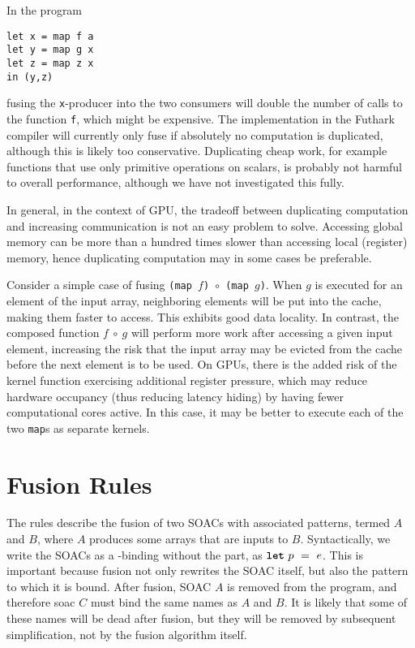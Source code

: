 \begin{description}[style=nextline]
\item[Computation may be duplicated.]

In the program
\begin{lstlisting}
let x = map f a
let y = map g x
let z = map z x
in (y,z)
\end{lstlisting}
fusing the \texttt{x}-producer into the two consumers will double the
number of calls to the function \texttt{f}, which might be expensive.
The implementation in the Futhark compiler will currently only fuse if
absolutely no computation is duplicated, although this is likely too
conservative.  Duplicating cheap work, for example functions that use
only primitive operations on scalars, is probably not harmful to
overall performance, although we have not investigated this fully.

In general, in the context of GPU, the tradeoff between duplicating
computation and increasing communication is not an easy problem to
solve.  Accessing global memory can be more than a hundred times
slower than accessing local (register) memory, hence duplicating
computation may in some cases be preferable.

\item[Can reduce memory locality.]

  Consider a simple case of fusing
  \texttt{(map~$f$)~$\circ$~(map~$g$)}.  When $g$ is executed for an
  element of the input array, neighboring elements will be put into
  the cache, making them faster to access.  This exhibits good data
  locality.  In contrast, the composed function $f~\circ~g$ will
  perform more work after accessing a given input element, increasing
  the risk that the input array may be evicted from the cache before
  the next element is to be used.  On GPUs, there is the added risk of
  the kernel function exercising additional register pressure, which
  may reduce hardware occupancy (thus reducing latency hiding) by
  having fewer computational cores active.  In this case, it may be
  better to execute each of the two \texttt{map}s as separate kernels.
\end{description}

\newpage
\section{Fusion Rules}

The rules describe the fusion of two SOACs with associated patterns,
termed $A$ and $B$, where $A$ produces some arrays that are inputs to
$B$.  Syntactically, we write the SOACs as a -binding without
the  part, as $\mbox{\texttt{\bfseries{let}}}~p~=~e$.  This is important because
fusion not only rewrites the SOAC itself, but also the pattern to
which it is bound.  After fusion, SOAC $A$ is removed from the
program, and therefore soac $C$ must bind the same names as $A$ and
$B$.  It is likely that some of these names will be dead after fusion,
but they will be removed by subsequent simplification, not by the
fusion algorithm itself.

